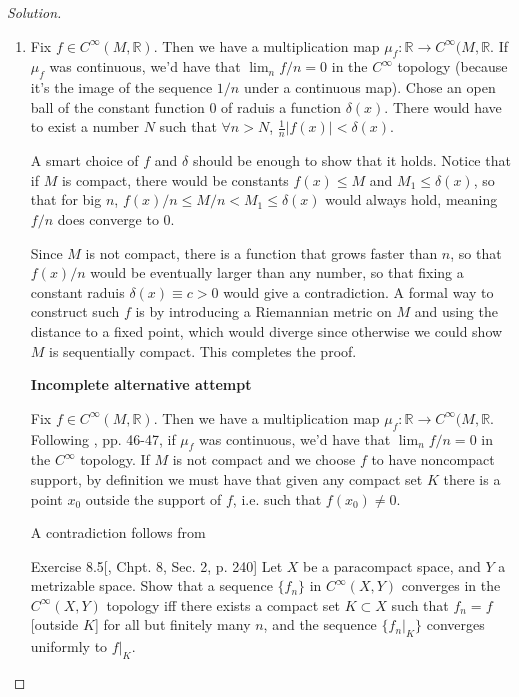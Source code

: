 \begin{proof}[Solution]\leavevmode
\begin{enumerate}[label=(\alph*)]
\item Fix \(f \in C^\infty (M,\mathbb{R})\). Then we have a multiplication map \(\mu_f:\mathbb{R}\to C^\infty (M,\mathbb{R}\). If \(\mu_f\) was continuous, we'd have that \(\lim_{n}f/n=0\) in the \(C^\infty\) topology (because it's the image of the sequence \(1/n\) under a continuous map). Chose an open ball of the constant function 0 of raduis a function \(\delta(x)\). There would have to exist a number \(N\) such that \(\forall n>N\), \(\frac{1}{n}|f(x)|<\delta(x)\).

	A smart choice of \(f\) and \(\delta\) should be enough to show that it holds. Notice that if \(M\) is compact,  there would be constants \(f(x) \leq M\) and \(M_1 \leq  \delta(x)\), so that for big \(n\), \(f(x)/n \leq  M/ n <  M_1 \leq \delta(x)\) would always hold, meaning \(f/n\) does converge to \(0\).

	Since \(M\) is not compact, there is a function that grows faster than \(n\), so that \(f(x)/n\) would be eventually larger than any number, so that fixing a constant raduis  \(\delta(x)\equiv c>0\) would give a contradiction. A formal way to construct such \(f\) is by introducing a Riemannian metric on \(M\) and using the distance to a fixed point, which would diverge since otherwise we could show \(M\) is sequentially compact. This completes the proof.

\textbf{Incomplete alternative attempt}


	Fix \(f \in C^\infty (M,\mathbb{R})\). Then we have a multiplication map \(\mu_f:\mathbb{R}\to C^\infty (M,\mathbb{R}\). Following \cite{gui2}, pp. 46-47, if \(\mu_f\) was continuous, we'd have that \(\lim_{n}f/n=0\) in the \(C^\infty\) topology. If \(M\) is not compact and we choose \(f\) to have noncompact support, by definition we must have that given any compact set \(K\) there is a point \(x_0\) outside the support of \(f\), i.e. such that \(f(x_0)\neq 0\).

	A contradiction follows from

	\begin{thing8}{Exercise 8.5}[\cite{muk}, Chpt. 8, Sec. 2, p. 240]\leavevmode
		Let \(X\) be a paracompact space, and \(Y\) a metrizable space. Show that a sequence \(\{f_n\}\) in \(C^\infty(X,Y)\) converges in the \(C^\infty(X,Y)\) topology iff there exists a compact set \(K \subset X\) such that \(f_n=f\) {\color{2}[outside \(K\)]} for all but finitely many \(n\), and the sequence \(\{f_n|_{K}\}\) converges uniformly to \(f|_{K}\).
	\end{thing8}


\end{enumerate}
\end{proof}
